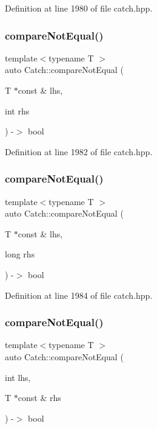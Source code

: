 Definition at line 1980 of file catch.\+hpp.

\mbox{\label{namespace_catch_aa81c95898f22dce1f61d7710e495d1ee}} 
\subsubsection{compareNotEqual()\hspace{0.1cm}{\footnotesize\ttfamily [2/5]}}
{\footnotesize\ttfamily template$<$typename T $>$ \\
auto Catch\+::compare\+Not\+Equal (\begin{DoxyParamCaption}\item[{T $\ast$const \&}]{lhs,  }\item[{int}]{rhs }\end{DoxyParamCaption}) -\/$>$ bool }



Definition at line 1982 of file catch.\+hpp.

\mbox{\label{namespace_catch_adad6539b3780b9a8953221efd038e2e4}} 
\subsubsection{compareNotEqual()\hspace{0.1cm}{\footnotesize\ttfamily [3/5]}}
{\footnotesize\ttfamily template$<$typename T $>$ \\
auto Catch\+::compare\+Not\+Equal (\begin{DoxyParamCaption}\item[{T $\ast$const \&}]{lhs,  }\item[{long}]{rhs }\end{DoxyParamCaption}) -\/$>$ bool }



Definition at line 1984 of file catch.\+hpp.

\mbox{\label{namespace_catch_adb4b3e912b89a987025ca28cf0c92ba8}} 
\subsubsection{compareNotEqual()\hspace{0.1cm}{\footnotesize\ttfamily [4/5]}}
{\footnotesize\ttfamily template$<$typename T $>$ \\
auto Catch\+::compare\+Not\+Equal (\begin{DoxyParamCaption}\item[{int}]{lhs,  }\item[{T $\ast$const \&}]{rhs }\end{DoxyParamCaption}) -\/$>$ bool }



